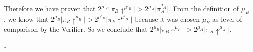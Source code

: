 Therefore we have proven that $2^{\mu'_B} \vert \pi_B \uparrow^{\mu'_B} \vert >
2^{\mu_\mathcal{A}} \vert \pi_\mathcal{A}^{\mu_\mathcal{A}} \vert$. From the definition of $\mu_B$, we know
that $2^{\mu_B} \vert \pi_B \uparrow^{\mu_B} \vert > 2^{\mu'_B} \vert \pi_B
\uparrow^{\mu'_B} \vert$ because it was chosen $\mu_B$ as level of comparison
by the Verifier. So we conclude that $2^{\mu_B} \vert \pi_B \uparrow^{\mu_B}
\vert > 2^{\mu_\mathcal{A}} \vert \pi_\mathcal{A} \uparrow^{\mu_\mathcal{A}} \vert$.

\begin{flushright}
$\square$
\end{flushright}